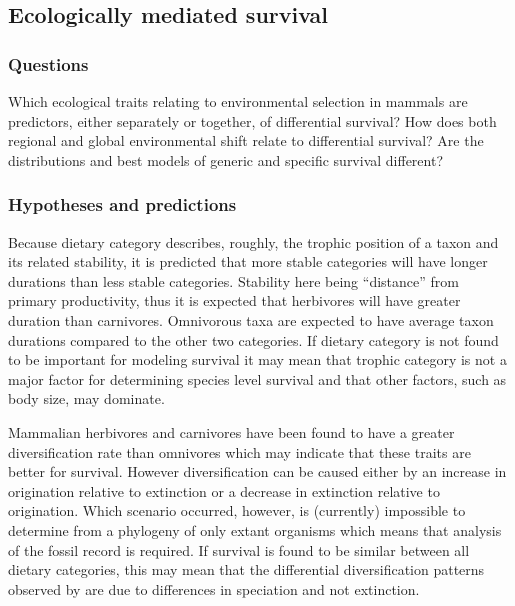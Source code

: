 \documentclass[12pt,letterpaper]{article}
\begin{document}
\subsection{Ecologically mediated survival} \label{sec:mamsurv}
\subsubsection{Questions} \label{sec:mamsurvques}
Which ecological traits relating to environmental selection in mammals are predictors, either separately or together, of differential survival? How does both regional and global environmental shift relate to differential survival? Are the distributions and best models of generic and specific survival different? 

\subsubsection{Hypotheses and predictions} \label{sec:mamsurvback}
Because dietary category describes, roughly, the trophic position of a taxon and its related stability, it is predicted that more stable categories will have longer durations than less stable categories. Stability here being ``distance'' from primary productivity, thus it is expected that herbivores will have greater duration than carnivores. Omnivorous taxa are expected to have average taxon durations compared to the other two categories. If dietary category is not found to be important for modeling survival it may mean that trophic category is not a major factor for determining species level survival and that other factors, such as body size, may dominate. 

Mammalian herbivores and carnivores have been found to have a greater diversification rate than omnivores \citep{Price2012} which may indicate that these traits are better for survival. However diversification can be caused either by an increase in origination relative to extinction or a decrease in extinction relative to origination. Which scenario occurred, however, is (currently) impossible to determine from a phylogeny of only extant organisms \citep{Rabosky2010a} which means that analysis of the fossil record is required. If survival is found to be similar between all dietary categories, this may mean that the differential diversification patterns observed by \citet{Price2012} are due to differences in speciation and not extinction.
\end{document}
